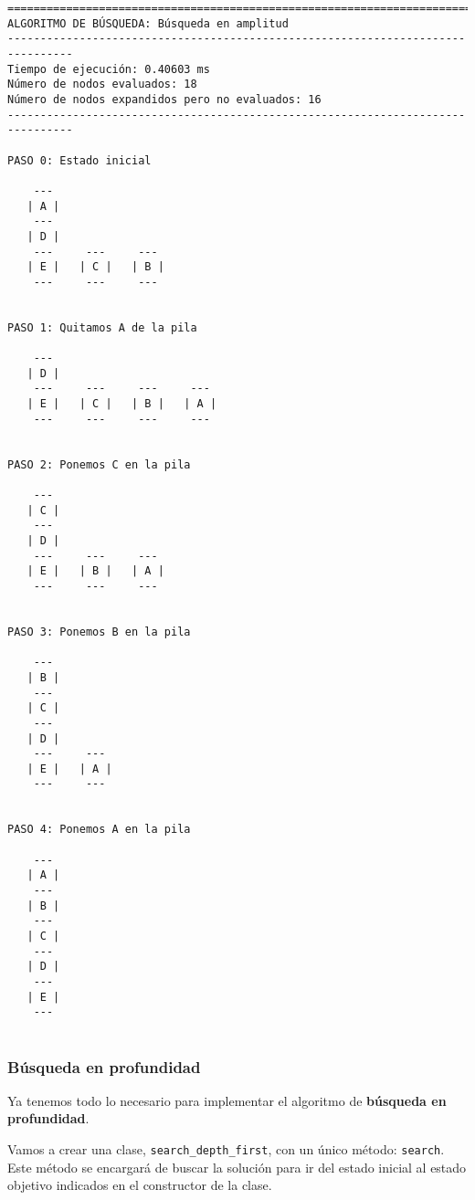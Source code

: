 \documentclass[11pt]{article}
\begin{document}
    \begin{Verbatim}[commandchars=\\\{\}]
================================================================================
ALGORITMO DE BÚSQUEDA: Búsqueda en amplitud
--------------------------------------------------------------------------------
Tiempo de ejecución: 0.40603 ms
Número de nodos evaluados: 18
Número de nodos expandidos pero no evaluados: 16
--------------------------------------------------------------------------------

PASO 0: Estado inicial

    --- 
   | A |
    --- 
   | D |
    ---     ---     --- 
   | E |   | C |   | B |
    ---     ---     --- 


PASO 1: Quitamos A de la pila

    --- 
   | D |
    ---     ---     ---     --- 
   | E |   | C |   | B |   | A |
    ---     ---     ---     --- 


PASO 2: Ponemos C en la pila

    --- 
   | C |
    --- 
   | D |
    ---     ---     --- 
   | E |   | B |   | A |
    ---     ---     --- 


PASO 3: Ponemos B en la pila

    --- 
   | B |
    --- 
   | C |
    --- 
   | D |
    ---     --- 
   | E |   | A |
    ---     --- 


PASO 4: Ponemos A en la pila

    --- 
   | A |
    --- 
   | B |
    --- 
   | C |
    --- 
   | D |
    --- 
   | E |
    --- 


    \end{Verbatim}

    \hypertarget{buxfasqueda-en-profundidad}{%
\subsubsection{Búsqueda en
profundidad}\label{buxfasqueda-en-profundidad}}

Ya tenemos todo lo necesario para implementar el algoritmo de
\textbf{búsqueda en profundidad}.

Vamos a crear una clase, \texttt{search\_depth\_first}, con un único
método: \texttt{search}. Este método se encargará de buscar la solución
para ir del estado inicial al estado objetivo indicados en el
constructor de la clase.
\end{document}
